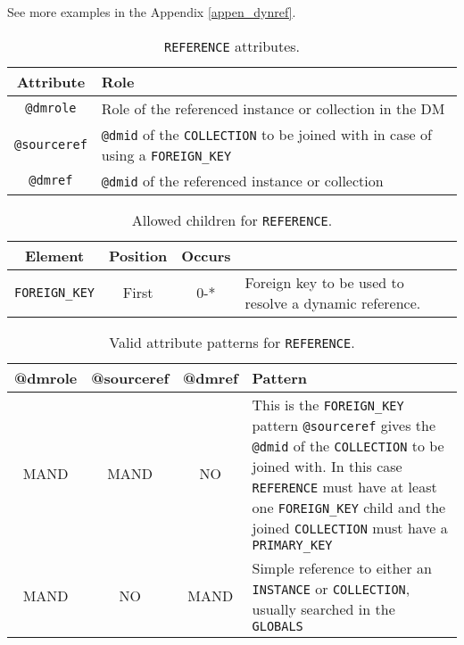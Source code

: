 See more examples in the Appendix \ref{appen_dynref}. 

\begin{table}[!htbp]
\small
\centering
\begin{tabulary}{\linewidth}{|c|J|}       
       \hline 
            \textbf{Attribute} & 
            \textbf {Role}\\
       \hline         \hline  
            \texttt{@dmrole} & 
            Role of the referenced instance or collection in the DM \\
        \hline 
            \texttt{@sourceref}  &
            \texttt{@dmid} of the \texttt{COLLECTION} to be joined with in case of using a \texttt{FOREIGN\_KEY} \\
        \hline 
            \texttt{@dmref} & 
            \texttt{@dmid} of the referenced instance or collection\\
        \hline 
     \end{tabulary}
     \caption{\texttt{REFERENCE} attributes.} 
     \label{tbl:reference-att}
 \end{table}

\begin{table}[!htbp]
\small
\centering
\begin{tabulary}{\linewidth}{|c |c |c|J|}
    \hline 
        \textbf{Element} &
        \textbf{Position} &
        \textbf{Occurs} &
        \\
    \hline      \hline  
        \texttt{FOREIGN\_KEY}  &        
        First &           
        0-* &
        Foreign key to be used to resolve a dynamic reference.\\
    \hline 
\end{tabulary}
     \caption{Allowed children for \texttt{REFERENCE}.} 
     \label{tbl:reference-children}
\end{table}


\begin{table}[!htbp]
\small
\centering
\begin{tabulary}{\linewidth}{|c|c|c|J|}
    \hline 
        \textbf{@dmrole} &
        \textbf{@sourceref} &
        \textbf{@dmref} &
        \textbf{Pattern}\\
    \hline      \hline  
        MAND &           
        MAND &           
        NO &           
        This is the \texttt{FOREIGN\_KEY} pattern \texttt{@sourceref} gives the  \texttt{@dmid} of the \texttt{COLLECTION} to be joined with. In this case \texttt{REFERENCE} must have at least one \texttt{FOREIGN\_KEY} child and the joined \texttt{COLLECTION} must have a \texttt{PRIMARY\_KEY}\\
    \hline   
        MAND &           
        NO &           
        MAND &           
        Simple reference to either an \texttt{INSTANCE} or \texttt{COLLECTION}, usually searched in the \texttt{GLOBALS}\\
   \hline 
\end{tabulary}
     \caption{Valid attribute patterns for  \texttt{REFERENCE}.}
     \label{tbl:reference-pattern}
\end{table}

